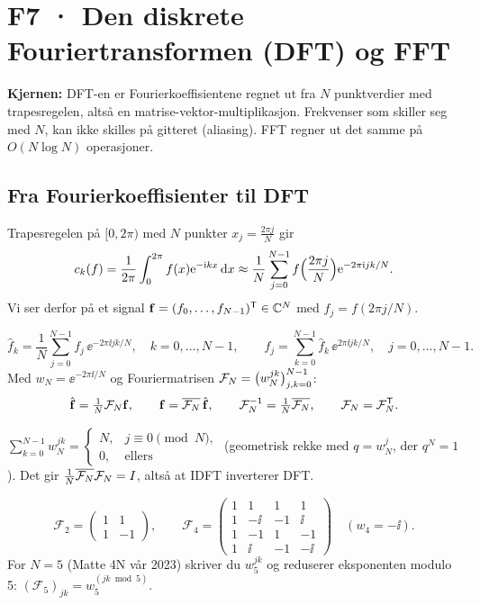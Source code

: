 \section{F7 · Den diskrete Fouriertransformen (DFT) og FFT}

\textbf{Kjernen:} DFT-en er Fourierkoeffisientene regnet ut fra $N$ punktverdier med trapesregelen, altså en matrise-vektor-multiplikasjon. Frekvenser som skiller seg med $N$, kan ikke skilles på gitteret (aliasing). FFT regner ut det samme på $O(N\log N)$ operasjoner.

\subsection{Fra Fourierkoeffisienter til DFT}
Trapesregelen på $[0,2\pi)$ med $N$ punkter $x_j=\frac{2\pi j}N$ gir
\[
c_k(f)=\frac1{2\pi}\int_0^{2\pi}f(x)\mathrm{e}^{-\mathrm{i} kx}\,\mathrm{d} x\approx\frac1N\sum_{j=0}^{N-1}f\Bigl(\frac{2\pi j}{N}\Bigr)\mathrm{e}^{-2\pi\mathrm{i} jk/N}.
\]
Vi ser derfor på et signal $\mathbf{f}=(f_0,\dots,f_{N-1})^{\mathsf{T}}\in\mathbb{C}^N$ med $f_j=f(2\pi j/N)$.

\begin{formel}
\[
\hat f_k=\frac1N\sum_{j=0}^{N-1}f_j\,\ee^{-2\pi\ii jk/N},\quad k=0,\dots,N-1,\qquad
f_j=\sum_{k=0}^{N-1}\hat f_k\,\ee^{2\pi\ii jk/N},\quad j=0,\dots,N-1.
\]
Med $w_N=\ee^{-2\pi\ii/N}$ og Fouriermatrisen $\mathcal{F}_N=\bigl(w_N^{jk}\bigr)_{j,k=0}^{N-1}$:
\[
\hat{\mathbf{f}}=\tfrac1N\mathcal{F}_N\mathbf{f},\qquad \mathbf{f}=\overline{\mathcal{F}_N}\,\hat{\mathbf{f}},\qquad \mathcal{F}_N^{-1}=\tfrac1N\overline{\mathcal{F}_N},\qquad \mathcal{F}_N=\mathcal{F}_N^{\mathsf{T}}.
\]
\end{formel}
\begin{teorem}
$\displaystyle\sum_{k=0}^{N-1}w_N^{jk}=\begin{cases}N,& j\equiv0\pmod N,\\0,&\text{ellers}\end{cases}$ \quad (geometrisk rekke med $q=w_N^j$, der $q^N=1$).
Det gir $\frac1N\overline{\mathcal{F}_N}\mathcal{F}_N=I$, altså at IDFT inverterer DFT.
\end{teorem}
\begin{eksempel}
\[
\mathcal F_2=\begin{pmatrix}1&1\\1&-1\end{pmatrix},\qquad
\mathcal F_4=\begin{pmatrix}1&1&1&1\\1&-\ii&-1&\ii\\1&-1&1&-1\\1&\ii&-1&-\ii\end{pmatrix}\quad(w_4=-\ii).
\]
For $N=5$ (Matte 4N vår 2023) skriver du $w_5^{jk}$ og reduserer eksponenten modulo 5: $(\mathcal F_5)_{jk}=w_5^{(jk\bmod 5)}$.
\end{eksempel}

